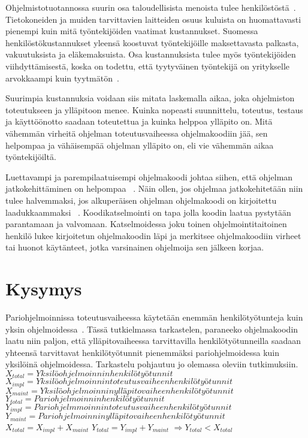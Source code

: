 \documentclass[finnish]{tktltiki2}
\theoremstyle{definition}
\theoremstyle{remark}
\begin{document}
Ohjelmistotuotannossa suurin osa taloudellisista menoista tulee henkilöstöstä~\cite{haikala1995ohjelmistotuotanto}. Tietokoneiden ja muiden tarvittavien laitteiden osuus kuluista on huomattavasti pienempi kuin mitä työntekijöiden vaatimat kustannukset. Suomessa henkilöstökustannukset yleensä koostuvat työntekijöille maksettavasta palkasta, vakuutuksista ja eläkemaksuista. Osa kustannuksista tulee myös työntekijöiden viihdyttämisestä, koska on todettu, että tyytyväinen työntekijä on yritykselle arvokkaampi kuin tyytmätön~\cite{airo2008oma}.

Suurimpia kustannuksia voidaan siis mitata laskemalla aikaa, joka ohjelmiston toteutukseen ja ylläpitoon menee. Kuinka nopeasti suunnittelu, toteutus, testaus ja käyttöönotto saadaan toteutettua ja kuinka helppoa ylläpito on.  Mitä vähemmän virheitä ohjelman toteutusvaiheessa ohjelmakoodiin jää, sen helpompaa ja vähäisempää ohjelman ylläpito on, eli vie vähemmän aikaa työntekijöiltä.

Luettavampi ja parempilaatuisempi ohjelmakoodi johtaa siihen, että ohjelman jatkokehittäminen on helpompaa ~\cite{johnson1994instrumented}. Näin ollen, jos ohjelmaa jatkokehitetään niin tulee halvemmaksi, jos alkuperäisen ohjelman ohjelmakoodi on kirjoitettu laadukkaammaksi ~\cite{fagan2001design}. Koodikatselmointi on tapa jolla koodin laatua pystytään parantamaan ja valvomaan. Katselmoidessa joku toinen ohjelmointitaitoinen henkilö lukee kirjoitetun ohjelmakoodin läpi ja merkitsee ohjelmakoodiin virheet tai huonot käytänteet, jotka varsinainen ohjelmoija sen jälkeen korjaa. 


\section{Kysymys}

Pariohjelmoinnissa toteutusvaiheessa käytetään enemmän henkilötyötunteja kuin yksin ohjelmoidessa~\cite{costandbenefit2}. Tässä tutkielmassa tarkastelen, paraneeko ohjelmakoodin laatu niin paljon, että ylläpitovaiheessa tarvittavilla henkilötyötunneilla saadaan yhteensä tarvittavat henkilötyötunnit pienemmäksi pariohjelmoidessa kuin yksilöinä ohjelmoidessa. Tarkastelu pohjautuu jo olemassa oleviin tutkimuksiin.\newline\newline
$X_{total} = Yksilöohjelmoinnin henkilötyötunnit $\newline
$X_{impl} = Yksilöohjelmoinnin toteutusvaiheen henkilötyötunnit $\newline
$X_{maint} = Yksilöohjelmoinnin ylläpitovaiheen henkilötyötunnit $\newline
$Y_{total} = Pariohjelmoinnin henkilötyötunnit $\newline
$Y_{impl} = Pariohjelmmoinnin toteutusvaiheen henkilötyötunnit $\newline
$Y_{maint} = Pariohjelmoinnin ylläpitovaiheen henkilötyötunnit $\newline
$X_{total} = X_{impl} + X_{maint} $\newline
$Y_{total} = Y_{impl} + Y_{maint} $\newline
$\Rightarrow Y_{total} < X_{total}$ \newline
\end{document}
